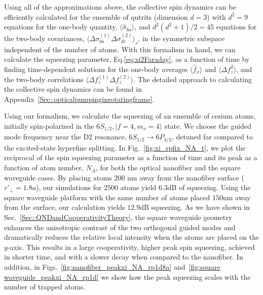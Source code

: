 \documentclass[preprint,aps,pra,onecolumn,superscriptaddress]{revtex4-1} %
\def\ket#1{\lvert{#1}\rangle}%
\newcommand{\expect}[1]{\big\langle #1 \big\rangle}
\begin{document}
Using all of the approximations above, the collective spin dynamics can be efficiently calculated for the ensemble of qutrits (dimension  $d=3$) with $ d^2=9 $ equations for the one-body quantity, $ \expect{\hat{\sigma}_{ba}} $, and $ d^2(d^2+1)/2=45 $ equations for the two-body covariances, $ \expect{\Delta \sigma_{ba}^{(1)}\Delta\sigma_{dc}^{(2)} }_s $, in the symmetric subspace independent of the number of atoms.  With this formalism in hand, we can calculate the squeezing parameter, Eq.\eqref{eq:xi2Faraday}, as a function of time by finding time-dependent solutions for the one-body averages $\expect{\hat{f}_x}$ and  $\expect{\Delta f_z^2}$, and the two-body correlations $\expect{\Delta f_z^{(1)} \Delta f_z^{(2)}}$.  The detailed approach to calculating the collective spin dynamics can be found in Appendix~\ref{Sec::opticalpumpinginrotatingframe}. 

Using our formalism, we calculate the squeezing of an ensemble of cesium atoms, initially spin-polarized in the $6S_{1/2},\ket{f=4, m_x=4}$ state.  We choose the guided mode frequency near the D2 resonance, $6S_{1/2}\rightarrow 6P_{3/2}$, detuned far compared to the excited-state hyperfine splitting. In Fig.~\ref{fig:xi_rpfix_NA_t}, we plot the reciprocal of the spin squeezing parameter as a function of time and its peak as a function of atom number, $ N_A $, for both the optical nanofiber and the square waveguide cases. By placing atoms $ 200$ nm away from the nanofiber surface ($ r'\!_\perp=1.8a $), our simulations for $ 2500 $ atoms yield $ 6.3 $dB of squeezing. Using the square waveguide platform with the same number of atoms placed $150 $nm away from the surface, our calculation yields $12.9$dB squeezing. As we have shown in Sec.~\ref{Sec::QNDandCooperativityTheory}, the square waveguide geometry enhances the anisotropic contrast of the two orthogonal guided modes and dramatically reduces the relative local intensity when the atoms are placed on the $ y $-axis. This results in a large cooperativity, higher peak spin squeezing, achieved in shorter time, and with a slower decay when compared to the nanofiber. 
In addition, in Figs.~\ref{fig:nanofiber_peakxi_NA_rp1d8a} and~\ref{fig:square waveguide_peakxi_NA_rp1d} we show how the peak squeezing scales with the number of trapped atoms. 
\end{document}
